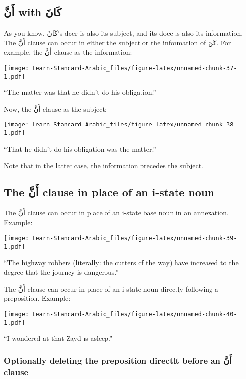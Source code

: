 \documentclass[
  10pt,
]{book}
\begin{document}
\subsection{\texorpdfstring{\foreignlanguage{arabic}{أَنَّ} with \foreignlanguage{arabic}{کَانَ}}{أَنَّ with کَانَ}}\label{ux623ux646-with-ux643ux627ux646}

As you know, \foreignlanguage{arabic}{کَانَ}'s doer is also its subject, and its doee is also its information.
The \foreignlanguage{arabic}{أَنَّ} clause can occur in either the subject or the information of \foreignlanguage{arabic}{کَنَ}.
For example, the \foreignlanguage{arabic}{أَنَّ} clause as the information:

\texttt{[image: Learn-Standard-Arabic\_files/figure-latex/unnamed-chunk-37-1.pdf]}

\enquote{The matter was that he didn't do his obligation.}

Now, the \foreignlanguage{arabic}{أَنَّ} clause as the subject:

\texttt{[image: Learn-Standard-Arabic\_files/figure-latex/unnamed-chunk-38-1.pdf]}

\enquote{That he didn't do his obligation was the matter.}

Note that in the latter case, the information precedes the subject.

\subsection{\texorpdfstring{The \foreignlanguage{arabic}{أَنَّ} clause in place of an i-state noun}{The أَنَّ clause in place of an i-state noun}}\label{the-ux623ux646-clause-in-place-of-an-i-state-noun}

The \foreignlanguage{arabic}{أَنَّ} clause can occur in place of an i-state base noun in an annexation. Example:

\texttt{[image: Learn-Standard-Arabic\_files/figure-latex/unnamed-chunk-39-1.pdf]}

\enquote{The highway robbers (literally: the cutters of the way) have increased to the degree that the journey is dangerous.}

The \foreignlanguage{arabic}{أَنَّ} clause can occur in place of an i-state noun directly following a preposition. Example:

\texttt{[image: Learn-Standard-Arabic\_files/figure-latex/unnamed-chunk-40-1.pdf]}

\enquote{I wondered at that Zayd is asleep.}

\subsubsection{\texorpdfstring{Optionally deleting the preposition directlt before an \foreignlanguage{arabic}{أَنَّ} clause}{Optionally deleting the preposition directlt before an أَنَّ clause}}\label{optionally-deleting-the-preposition-directlt-before-an-ux623ux646-clause}
\end{document}
